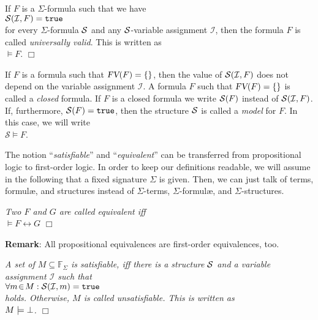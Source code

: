 \begin{Definition}
If $F$  is a  $\Sigma$-formula such that we have 
\\[0.2cm]
\hspace*{1.3cm} $\mathcal{S}(\mathcal{I}, F) = \mathtt{true}$
\\[0.2cm]
for every  $\Sigma$-formula $\mathcal{S}$ and any
$\mathcal{S}$-variable assignment  $\mathcal{I}$, then the formula 
$F$ is called \emph{universally valid}.  This is written as
\\[0.2cm]
\hspace*{1.3cm} $\models F$. \hspace*{\fill} $\Box$
\end{Definition}

If  $F$ is a formula such that $\textsl{FV}(F) = \{\}$, then the value of $\mathcal{S}(\mathcal{I}, F)$
does not depend on the variable assignment $\mathcal{I}$.  A formula $F$ such that
 $\textsl{FV}(F) = \{\}$ is called a \emph{closed} formula.
If $F$ is a closed formula we write $\mathcal{S}(F)$
instead of $\mathcal{S}(\mathcal{I}, F)$.  If, furthermore,  $\mathcal{S}(F) = \mathtt{true}$, then
the structure  $\mathcal{S}$ is called a  \emph{model} for $F$.  In this case, we will write \\[0.2cm]
\hspace*{1.3cm} $\mathcal{S} \models F$.
\vspace{0.1cm}

The notion  ``\emph{satisfiable}'' and ``\emph{equivalent}'' can be transferred from propositional
logic to first-order logic.   In order to keep our definitions readable, we will assume in the
following that a fixed signature  $\Sigma$ is given.
Then, we can just talk of terms, formul\ae, and structures instead of
$\Sigma$-terms, $\Sigma$-formul\ae, and $\Sigma$-structures.


\begin{Definition}[Equivalent]
{\em
  Two \formulae $F$ and $G$ are called \emph{equivalent} iff \\[0.2cm]
\hspace*{1.3cm} $\models F \leftrightarrow G$ 
} \hspace*{\fill} $\Box$
\end{Definition}

\noindent
\textbf{Remark}:
All propositional equivalences are first-order equivalences, too.

\begin{Definition}[Satisfiable]
{\em
    A set of \formulae $M \subseteq \mathbb{F}_\Sigma$ is  \emph{satisfiable},
    iff there is a structure  $\mathcal{S}$ and a variable assignment $\mathcal{I}$ such that 
      \\[0.2cm]
    \hspace*{1.3cm} 
    $\forall m \!\in\! M: \mathcal{S}(\mathcal{I},m) = \mathtt{true}$ \\[0.2cm]
    holds.  Otherwise,  $M$ is called  \emph{unsatisfiable}.
    This is written as \\[0.2cm]
    \hspace*{1.3cm} $M \models \bot$.
    \hspace*{\fill} $\Box$
} 
\end{Definition}

